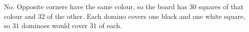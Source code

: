 $\boxed{\text{No}}$. Opposite corners have the same colour, so the board has $30$ squares of that colour and $32$ of the other. Each domino covers one black and one white square, so $31$ dominoes would cover $31$ of each.
